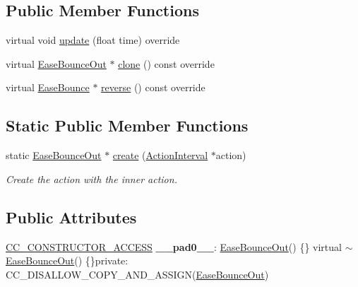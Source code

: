 \subsection*{Public Member Functions}
\begin{DoxyCompactItemize}
\item 
virtual void \hyperlink{classEaseBounceOut_a044e81fb5f2c10b4064891a9bfdae231}{update} (float time) override
\item 
virtual \hyperlink{classEaseBounceOut}{Ease\+Bounce\+Out} $\ast$ \hyperlink{classEaseBounceOut_ae0c5aff0f2e8c7fcfad0d8385e1e2ec1}{clone} () const override
\item 
virtual \hyperlink{classEaseBounce}{Ease\+Bounce} $\ast$ \hyperlink{classEaseBounceOut_a03b87127deebcdf81cc7422690d0375e}{reverse} () const override
\end{DoxyCompactItemize}
\subsection*{Static Public Member Functions}
\begin{DoxyCompactItemize}
\item 
static \hyperlink{classEaseBounceOut}{Ease\+Bounce\+Out} $\ast$ \hyperlink{classEaseBounceOut_a9ef9260e19c5826955bba6419bdee417}{create} (\hyperlink{classActionInterval}{Action\+Interval} $\ast$action)
\begin{DoxyCompactList}\small\item\em Create the action with the inner action. \end{DoxyCompactList}\end{DoxyCompactItemize}
\subsection*{Public Attributes}
\begin{DoxyCompactItemize}
\item 
\mbox{\label{classEaseBounceOut_a58452a5bccc0646c708f68628413e4cb}} 
\hyperlink{_2cocos2d_2cocos_2base_2ccConfig_8h_a25ef1314f97c35a2ed3d029b0ead6da0}{C\+C\+\_\+\+C\+O\+N\+S\+T\+R\+U\+C\+T\+O\+R\+\_\+\+A\+C\+C\+E\+SS} {\bfseries \+\_\+\+\_\+pad0\+\_\+\+\_\+}\+: \hyperlink{classEaseBounceOut}{Ease\+Bounce\+Out}() \{\} virtual $\sim$\hyperlink{classEaseBounceOut}{Ease\+Bounce\+Out}() \{\}private\+: C\+C\+\_\+\+D\+I\+S\+A\+L\+L\+O\+W\+\_\+\+C\+O\+P\+Y\+\_\+\+A\+N\+D\+\_\+\+A\+S\+S\+I\+GN(\hyperlink{classEaseBounceOut}{Ease\+Bounce\+Out})
\end{DoxyCompactItemize}
